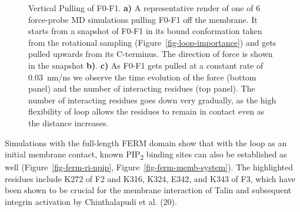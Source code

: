 \documentclass[
  letterpaper,
  DIV=11,
  numbers=noendperiod]{scrartcl}
\begin{document}
\begin{figure}
\begin{minipage}[t]{0.43\linewidth}
{{}

}

\subcaption{\label{fig-f0f1-vert-pull-vmd}~}
\end{minipage}%
%
\begin{minipage}[t]{0.56\linewidth}

{\centering 


}

\subcaption{\label{fig-f0f1-vert-pull}~}
\end{minipage}%

\caption{\label{fig-vert-pull}Vertical Pulling of F0-F1. \textbf{a)} A
representative render of one of 6 force-probe MD simulations pulling
F0-F1 off the membrane. It starts from a snapshot of F0-F1 in its bound
conformation taken from the rotational sampling
(Figure~\ref{fig-loop-importance}) and gets pulled upwards from its
C-terminus. The direction of force is shown in the snapshot \textbf{b)}.
\textbf{c)} As F0-F1 gets pulled at a constant rate of 0.03~nm/ns we
observe the time evolution of the force (bottom panel) and the number of
interacting residues (top panel). The number of interacting residues
goes down very gradually, as the high flexibility of loop allows the
residues to remain in contact even as the distance increases.}

\end{figure}

Simulations with the full-length FERM domain show that with the loop as
an initial membrane contact, known PIP\textsubscript{2} binding sites
can also be established as well
(Figure~\ref{fig-ferm-ri-npip}, Figure~\ref{fig-ferm-memb-system}). The
highlighted residues include K272 of F2 and K316, K324, E342, and K343
of F3, which have been shown to be crucial for the membrane interaction
of Talin and subsequent integrin activation by Chinthalapudi et al.
(20).
\end{document}
